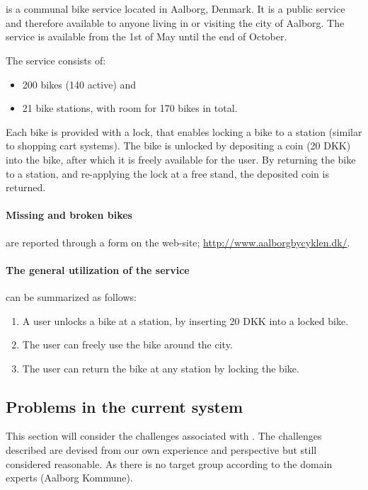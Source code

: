 \section{\citybike}\label{aalborg_bycyklen}
\citybike is a communal bike service located in Aalborg, Denmark.
It is a public service and therefore available to anyone living in or visiting the city of Aalborg.
The service is available from the 1st of May until the end of October.\cite{aalborgbycyklenbagcyklen}

\noindent The service consists of:
\begin{itemize}
\item 200 bikes (140 active) and 
\item 21 bike stations, with room for 170 bikes in total.
\end{itemize}
Each bike is provided with a lock, that enables locking a bike to a station (similar to shopping cart systems).
The bike is unlocked by depositing a coin (20 DKK) into the bike, after which it is freely available for the user.
By returning the bike to a station, and re-applying the lock at a free stand, the deposited coin is returned.

\paragraph{Missing and broken bikes} are reported through a form on the \citybike web-site; \url{http://www.aalborgbycyklen.dk/}.

\paragraph{The general utilization of the service} can be summarized as follows:
\begin{enumerate}
\item A user unlocks a bike at a station, by inserting 20 DKK into a locked bike.
\item The user can freely use the bike around the city.
\item The user can return the bike at any station by locking the bike.
\end{enumerate}

\subsection{Problems in the current system} \label{aalborg_bycyklen:challenges}
This section will consider the challenges associated with \citybike.
The challenges described are devised from our own experience and perspective but still considered reasonable.
As there is no target group according to the domain experts (Aalborg Kommune).


